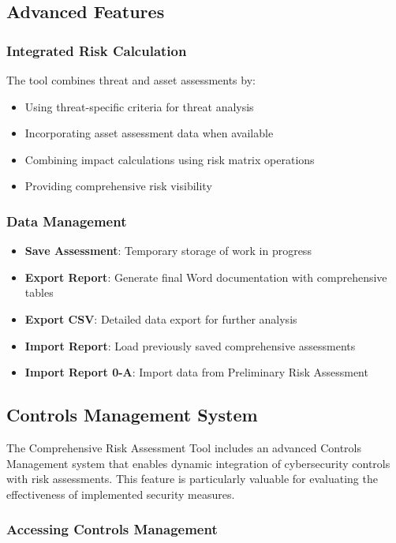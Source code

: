 \documentclass[binding=0.6cm]{sapthesis}
\begin{document}
\subsection{Advanced Features}

\subsubsection{Integrated Risk Calculation}
The tool combines threat and asset assessments by:
\begin{itemize}
    \item Using threat-specific criteria for threat analysis
    \item Incorporating asset assessment data when available
    \item Combining impact calculations using risk matrix operations
    \item Providing comprehensive risk visibility
\end{itemize}

\subsubsection{Data Management}
\begin{itemize}
    \item \textbf{Save Assessment}: Temporary storage of work in progress
    \item \textbf{Export Report}: Generate final Word documentation with comprehensive tables
    \item \textbf{Export CSV}: Detailed data export for further analysis
    \item \textbf{Import Report}: Load previously saved comprehensive assessments
    \item \textbf{Import Report 0-A}: Import data from Preliminary Risk Assessment
\end{itemize}

\subsection{Controls Management System}

The Comprehensive Risk Assessment Tool includes an advanced Controls Management system that enables dynamic integration of cybersecurity controls with risk assessments. This feature is particularly valuable for evaluating the effectiveness of implemented security measures.

\subsubsection{Accessing Controls Management}
\end{document}
